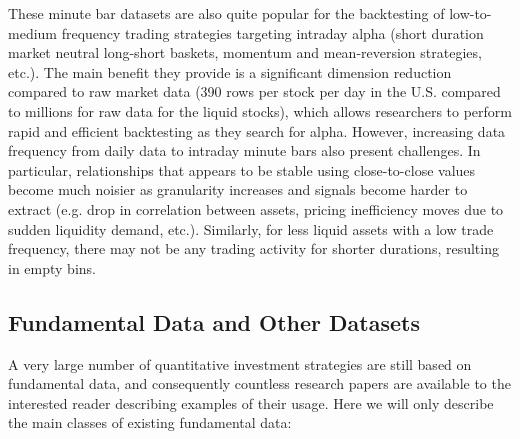 These minute bar datasets are also quite popular for the backtesting of low-to-medium frequency trading strategies targeting intraday alpha (short duration market neutral long-short baskets, momentum and mean-reversion strategies, etc.). The main benefit they provide is a significant dimension reduction compared to raw market data (390 rows per stock per day in the U.S. compared to millions for raw data for the liquid stocks), which allows researchers to perform rapid and efficient backtesting as they search for alpha. However, increasing data frequency from daily data to intraday minute bars also present challenges. In particular, relationships that appears to be stable using close-to-close values become much noisier as granularity increases and signals become harder to extract (e.g. drop in correlation between assets, pricing inefficiency moves due to sudden liquidity demand, etc.). Similarly, for less liquid assets with a low trade frequency, there may not be any trading activity for shorter durations, resulting in empty bins.



\subsection{Fundamental Data and Other Datasets\label{sec:fund_data_otherdat}}

A very large number of quantitative investment strategies are still based on fundamental data, and consequently countless research papers are available to the interested reader describing examples of their usage. Here we will only describe the main classes of existing fundamental data:


